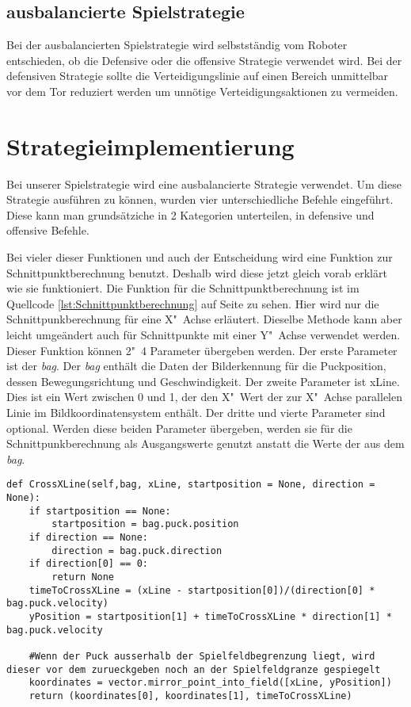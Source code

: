 \subsection{ausbalancierte Spielstrategie}
Bei der ausbalancierten Spielstrategie wird selbstständig vom Roboter entschieden, ob die Defensive oder die offensive Strategie verwendet wird. Bei der defensiven Strategie sollte die Verteidigungslinie auf einen Bereich unmittelbar vor dem Tor reduziert werden um unnötige Verteidigungsaktionen zu vermeiden.

\section{Strategieimplementierung}

Bei unserer Spielstrategie wird eine ausbalancierte Strategie verwendet. Um diese Strategie ausführen zu können, wurden vier unterschiedliche Befehle eingeführt. Diese kann man grundsätziche in 2 Kategorien unterteilen, in defensive und offensive Befehle. 

Bei vieler dieser Funktionen und auch der Entscheidung wird eine Funktion zur Schnittpunktberechnung benutzt. Deshalb wird diese jetzt gleich vorab erklärt wie sie funktioniert. Die Funktion für die Schnittpunktberechnung ist  im Quellcode \ref{lst:Schnittpunktberechnung} auf Seite \pageref{lst:Schnittpunktberechnung} zu sehen. Hier wird nur die Schnittpunkberechnung für eine X"~Achse erläutert. Dieselbe Methode kann aber leicht umgeändert auch für Schnittpunkte mit einer Y"~Achse verwendet werden. Dieser Funktion können 2"~4 Parameter übergeben werden. Der erste Parameter ist der \textit{bag}. Der \textit{bag} enthält die Daten der Bilderkennung für die Puckposition, dessen Bewegungsrichtung und Geschwindigkeit. Der zweite Parameter ist xLine. Dies ist ein Wert zwischen 0 und 1, der den X"~Wert der zur X"~Achse parallelen Linie im Bildkoordinatensystem enthält. Der dritte und vierte Parameter sind optional. Werden diese beiden Parameter übergeben, werden sie für die Schnittpunkberechnung als Ausgangswerte genutzt anstatt die Werte der aus dem \textit{bag}.

\begin{lstlisting}[caption= Python-Funktion für Schnittpunktberechnung, label=lst:Schnittpunktberechnung]
def CrossXLine(self,bag, xLine, startposition = None, direction = None):     
	if startposition == None:
		startposition = bag.puck.position
	if direction == None:
		direction = bag.puck.direction
	if direction[0] == 0:
		return None
	timeToCrossXLine = (xLine - startposition[0])/(direction[0] * bag.puck.velocity)
	yPosition = startposition[1] + timeToCrossXLine * direction[1] * bag.puck.velocity
	
	#Wenn der Puck ausserhalb der Spielfeldbegrenzung liegt, wird dieser vor dem zurueckgeben noch an der Spielfeldgranze gespiegelt
	koordinates = vector.mirror_point_into_field([xLine, yPosition])
	return (koordinates[0], koordinates[1], timeToCrossXLine)
\end{lstlisting}



